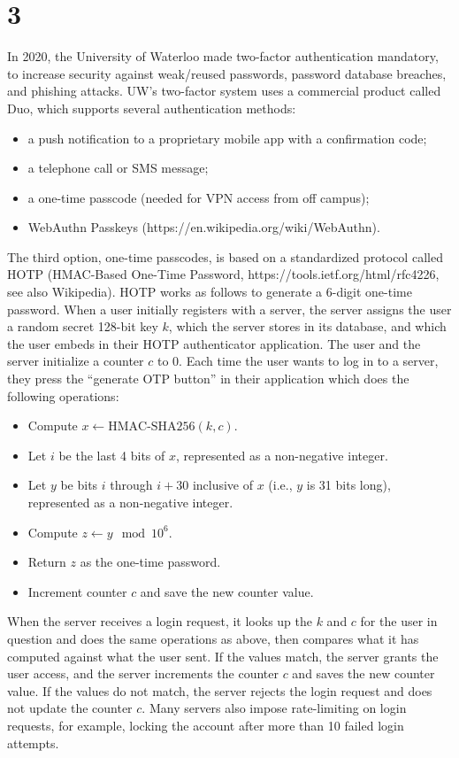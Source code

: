 \documentclass[11pt]{article}
\begin{document}
\newpage

\section{3}

In 2020, the University of Waterloo made two-factor authentication mandatory, to increase security against weak/reused passwords, password database breaches, and phishing attacks. UW's two-factor system uses a commercial product called Duo, which supports several authentication methods:
\begin{itemize}
  \item a push notification to a proprietary mobile app with a confirmation code;
  \item a telephone call or SMS message;
  \item a one-time passcode (needed for VPN access from off campus);
  \item WebAuthn Passkeys (https://en.wikipedia.org/wiki/WebAuthn).
\end{itemize}

The third option, one-time passcodes, is based on a standardized protocol called HOTP (HMAC-Based One-Time Password, https://tools.ietf.org/html/rfc4226, see also Wikipedia). HOTP works as follows to generate a 6-digit one-time password. When a user initially registers with a server, the server assigns the user a random secret 128-bit key $k$, which the server stores in its database, and which the user embeds in their HOTP authenticator application. The user and the server initialize a counter $c$ to 0.
Each time the user wants to log in to a server, they press the “generate OTP button” in their
application which does the following operations:
\begin{itemize}
  \item Compute $x \leftarrow \text{HMAC-SHA256}(k, c)$.
  \item Let $i$ be the last 4 bits of $x$, represented as a non-negative integer.
  \item Let $y$ be bits $i$ through $i+30$ inclusive of $x$ (i.e., $y$ is 31 bits long), represented as a non-negative integer.
  \item Compute $z \leftarrow y \mod 10^6$.
  \item Return $z$ as the one-time password.
  \item Increment counter $c$ and save the new counter value.
\end{itemize}

When the server receives a login request, it looks up the $k$ and $c$ for the user in question and does the same operations as above, then compares what it has computed against what the user sent. If the values match, the server grants the user access, and the server increments the counter $c$ and saves the new counter value. If the values do not match, the server rejects the login request and does not update the counter $c$. Many servers also impose rate-limiting on login requests, for example, locking the account after more than 10 failed login attempts.
\end{document}
